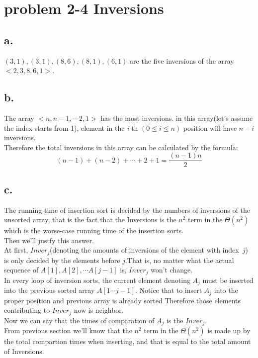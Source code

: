 \documentclass[oneside]{homework} %
\begin{document}
\maketitle
\newpage
\section{problem 2-4 Inversions}
\subsection*{a.}
	$(3,1),(3,1),(8,6),(8,1),(6,1)$ are the five inversions of the array $<2,3,8,6,1>$.
\subsection*{b.}
The array ${<n,n-1,\cdots\,2,1>}$ has the most inversions. in this array(let's assume the index starts from 1), element in the  \emph{i} th 
$(0\leq i\leq n)$ position will have $n-i$ inversions.\\Therefore the total inversions in this array can be calculated by the formula: 
$$(n-1)+(n-2)+\cdots+2+1=\frac{(n-1)n}{2}$$
\subsection*{c.}
	The running time of insertion sort is decided by the numbers of inversions of the unsorted array, that is the fact that the Inversions is the $n^2$ term in the $\Theta(n^2)$ which is the worse-case running time of the insertion sorts.\\
	Then we'll justfy this answer.\\
	At first, $Inver_{j}$(denoting the amounts of inversions of the element with index~$j$) is only decided by the elements before $j$.That is, no matter what the actual sequence of $A[1],A[2],\cdots A[j-1]$ is, $Inver_{j}$ won't change. \\
	In every loop of inversion sorts, the current element denoting $A_{j}$ must be inserted into the previous sorted array $A[1\cdots j-1]$. Notice that to insert $A_{j}$ into the proper position and previous array is already sorted Therefore those elements contributing to $Inver_{j}$ now is neighbor.\\ Now we can say that the times of comparation of $A_{j}$ is the  $Inver_{j}$.\\
From previous section we'll know that the $n^2$ term in the $\Theta(n^2)$ is made up by the total compartion times when inserting, and that is equal to the total amount of Inversions.
\end{document}
